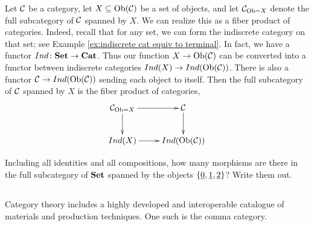 \begin{example}

Let $\mathcal{C}$ be a category, let $X\subseteq\textnormal{Ob}(\mathcal{C})$ be a set of objects, and let $\mathcal{C}_{\textnormal{Ob}=X}$ denote the full subcategory of $\mathcal{C}$ spanned by $X$. We can realize this as a fiber product of categories. Indeed, recall that for any set, we can form the indiscrete category on that set; see Example \ref{ex:indiscrete cat equiv to terminal}. In fact, we have a functor $Ind\colon{\bf Set}\rightarrow{\bf Cat}$. Thus our function $X\rightarrow\textnormal{Ob}(\mathcal{C})$ can be converted into a functor between indiscrete categories $Ind(X)\rightarrow Ind(\textnormal{Ob}(\mathcal{C}))$. There is also a functor $\mathcal{C}\rightarrow Ind(\textnormal{Ob}(\mathcal{C}))$ sending each object to itself. Then the full subcategory of $\mathcal{C}$ spanned by $X$ is the fiber product of categories,
$$\xymatrix{\mcC_{\Ob=X}\ar[r]\ar[d]&\mcC\ar[d]\\Ind(X)\ar[r]&Ind(\Ob(\mcC))}$$

\end{example}

\begin{exercise}
Including all identities and all compositions, how many morphisms are there in the full subcategory of ${\bf Set}$ spanned by the objects $\{\underline{0},\underline{1},\underline{2}\}$? Write them out.
\end{exercise}


\subsection{}\label{sec:comma}

Category theory includes a highly developed and interoperable catalogue of materials and production techniques. One such is the comma category.

